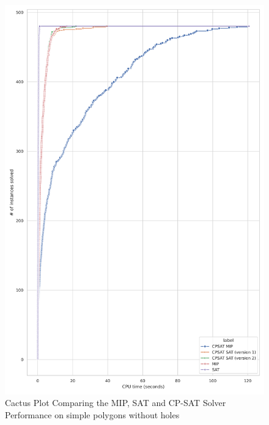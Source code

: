 \begin{figure}[htbp]
\centering
\includegraphics[scale=0.7]{Thesis/figures/final_benchmark_cactus_plot_runtime_MIP_SAT_CPSAT_without_holes.png}
\caption{Cactus Plot Comparing the MIP, SAT and CP-SAT Solver Performance on simple polygons without holes}
\label{fig:cactus_all_simple_no_holes}
\end{figure}

